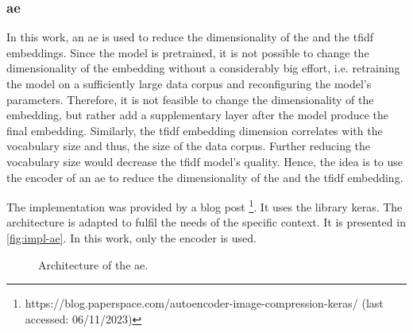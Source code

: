 \subsubsection*{\acl{ae}}\label{subsubsec:impl-autoencoder}

In this work, an \ac{ae} is used to reduce the dimensionality of the \infersent{} and the \ac{tfidf} embeddings.
Since the \infersent{} model is pretrained, it is not possible to change the dimensionality of the embedding without a considerably big effort,
i.e. retraining the model on a sufficiently large data corpus and reconfiguring the model's parameters.
Therefore, it is not feasible to change the dimensionality of the \infersent{} embedding, but rather add a supplementary layer after the model 
produce the final embedding.
Similarly, the \ac{tfidf} embedding dimension correlates with the vocabulary size and thus, the size of the data corpus.
Further reducing the vocabulary size would decrease the \ac{tfidf} model's quality.
Hence, the idea is to use the encoder of an \ac{ae} to reduce the dimensionality of the \infersent{} and the \ac{tfidf} embedding.

The implementation was provided by a blog post
\footnote{https://blog.paperspace.com/autoencoder-image-compression-keras/ (last accessed: 06/11/2023)}.
It uses the library keras.
The architecture is adapted to fulfil the needs of the specific context.
It is presented in \autoref{fig:impl-ae}.
In this work, only the encoder is used.
%     

\begin{figure}[h] %
    \centering
    
    \caption[Architecture of the \ac{ae}]{Architecture of the \ac{ae}.}
    \label{fig:impl-ae}
\end{figure}